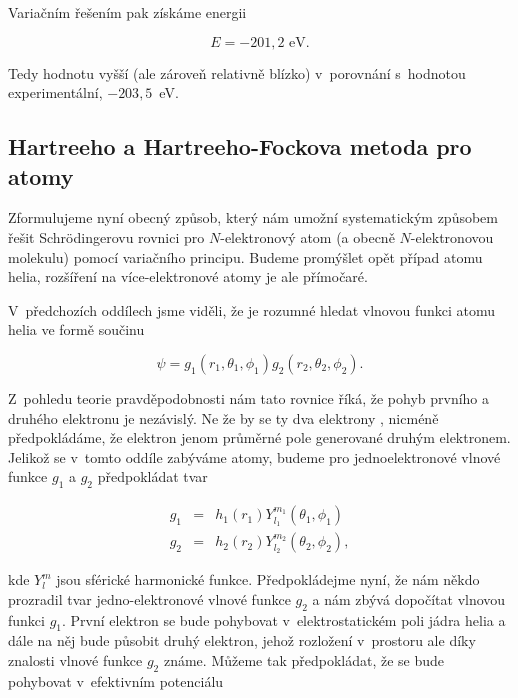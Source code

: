 \noindent Variačním řešením pak získáme energii

\begin{equation}
E = - 201{,}2 \mbox{ eV}. \nonumber
\end{equation}

\noindent Tedy hodnotu vyšší (ale zároveň relativně blízko) v~porovnání s~hodnotou experimentální, $-203{,}5$~eV. 


\subsection{Hartreeho a Hartreeho-Fockova metoda pro atomy}
 
Zformulujeme nyní obecný způsob, který nám umožní systematickým způsobem řešit Schr\"odingerovu rovnici pro $N$-elektronový atom (a obecně $N$-elektronovou molekulu) pomocí variačního principu. Budeme promýšlet opět případ atomu helia, rozšíření na více-elektronové atomy je ale přímočaré. 

V~předchozích oddílech jsme viděli, že je rozumné hledat vlnovou funkci atomu helia ve formě součinu
 
\begin{equation}
\psi = g_1(r_1, \theta_1, \phi_1) g_2(r_2,\theta_2, \phi_2).
\label{rov:VE-39}
\end{equation}
 
\noindent Z~pohledu teorie pravděpodobnosti nám tato rovnice říká, že pohyb prvního a druhého elektronu je nezávislý. Ne že by se ty dva elektrony , nicméně předpokládáme, že elektron  jenom průměrné pole generované druhým elektronem. Jelikož se v~tomto oddíle zabýváme atomy, budeme pro jednoelektronové vlnové funkce $g_1$ a $g_2$ předpokládat tvar 
  
\begin{eqnarray}
g_1 &=& h_1(r_1) Y_{l_1}^{m_1} (\theta_1,\phi_1) \\
g_2 &=& h_2(r_2) Y_{l_2}^{m_2} (\theta_2,\phi_2),
\end{eqnarray}
  
\noindent kde $Y_{l}^{m}$ jsou sférické harmonické funkce. Předpokládejme nyní, že nám někdo prozradil tvar jedno-elektronové vlnové funkce $g_2$ a nám zbývá dopočítat vlnovou funkci $g_1$. První elektron se bude pohybovat v~elektrostatickém poli jádra helia a dále na něj bude působit druhý elektron, jehož rozložení v~prostoru ale díky znalosti vlnové funkce $g_2$ známe. Můžeme tak předpokládat, že se bude pohybovat v~efektivním potenciálu
  
